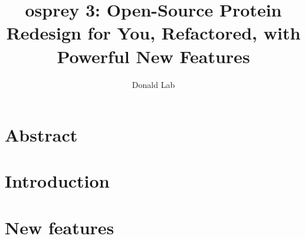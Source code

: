 \documentclass[11pt, oneside]{article}   	%
\title{{\sc osprey} 3: Open-Source Protein Redesign for You, Refactored, with Powerful New Features}
\author{Donald Lab}
\begin{document}
\maketitle

\section{Abstract}

\section{Introduction}


\section{New features}





\end{document}
